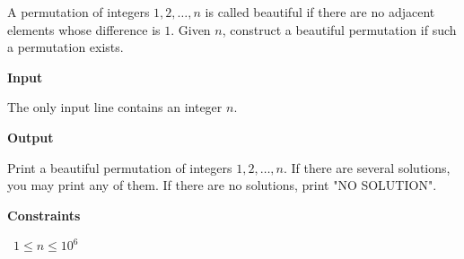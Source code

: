 A permutation of integers $1,2,\ldots,n$ is called beautiful if there are no adjacent elements whose difference is $1$.
Given $n$, construct a beautiful permutation if such a permutation exists.

\vspace{0.3cm}\noindent\textbf{Input}

The only input line contains an integer $n$.

\vspace{0.3cm}\noindent\textbf{Output}

Print a beautiful permutation of integers $1,2,\ldots,n$. If there are several solutions, you may print any of them. If there are no solutions, print "NO SOLUTION".

\vspace{0.3cm}\noindent\textbf{Constraints}

\textbullet\ $1 \le n \le 10^6$